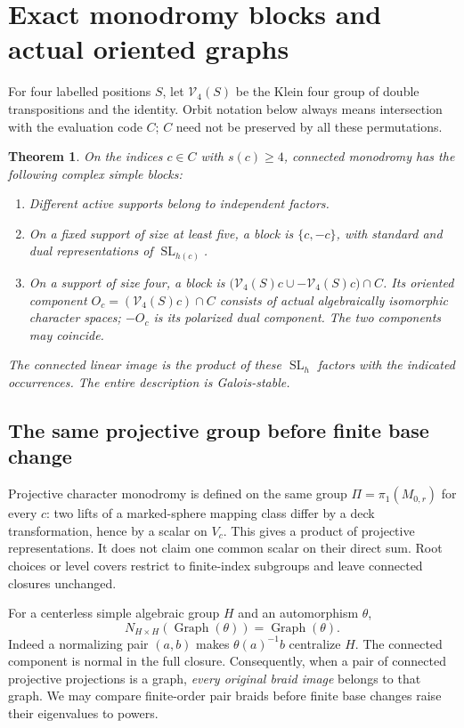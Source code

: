 \documentclass[11pt]{article}
\newtheorem{theorem}{Theorem}[section]
\theoremstyle{definition}
\newcommand{\SL}{\operatorname{SL}}
\begin{document}
\section{Exact monodromy blocks and actual oriented graphs}\label{sec:blocks}
For four labelled positions $S$, let $\mathcal V_4(S)$ be the Klein four
group of double transpositions and the identity. Orbit notation below always
means intersection with the evaluation code $C$; $C$ need not be preserved
by all these permutations.

\begin{theorem}\label{thm:blocks}
On the indices $c\in C$ with $s(c)\geq4$, connected monodromy has the
following complex simple blocks:
\begin{enumerate}
\item Different active supports belong to independent factors.
\item On a fixed support of size at least five, a block is $\{c,-c\}$,
with standard and dual representations of $\SL_{h(c)}$.
\item On a support of size four, a block is
$\bigl(\mathcal V_4(S)c\cup-\mathcal V_4(S)c\bigr)\cap C$.
Its oriented component $O_c=(\mathcal V_4(S)c)\cap C$ consists of
actual algebraically isomorphic character spaces; $-O_c$ is its polarized
dual component. The two components may coincide.
\end{enumerate}
The connected linear image is the product of these $\SL_h$ factors with
the indicated occurrences. The entire description is Galois-stable.
\end{theorem}

\subsection{The same projective group before finite base change}
Projective character monodromy is defined on the same group
$\Pi=\pi_1(M_{0,r})$ for every $c$: two lifts of a marked-sphere mapping
class differ by a deck transformation, hence by a scalar on $V_c$.
This gives a product of projective representations. It does not claim one
common scalar on their direct sum. Root choices or level covers restrict to
finite-index subgroups and leave connected closures unchanged.

For a centerless simple algebraic group $H$ and an automorphism $\theta$,
\begin{equation}\label{eq:normalizer}
 N_{H\times H}(\operatorname{Graph}(\theta))
 =\operatorname{Graph}(\theta).
\end{equation}
Indeed a normalizing pair $(a,b)$ makes $\theta(a)^{-1}b$ centralize $H$.
The connected component is normal in the full closure. Consequently, when a
pair of connected projective projections is a graph, \emph{every original
braid image} belongs to that graph. We may compare finite-order pair braids
before finite base changes raise their eigenvalues to powers.
\end{document}
